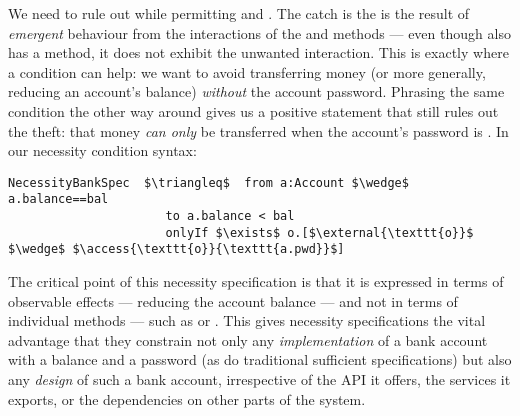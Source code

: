 We need to rule out  while permitting  and
. The catch is the   is the result
of  \emph{emergent} behaviour from the interactions of the 
and  methods --- even though  also has a
 method, it does not exhibit the unwanted interaction.
This is exactly where a  condition can help:
we want to avoid transferring money
(or more generally, reducing an account's balance)
\textit{without} the  account password.  Phrasing the same condition
the other way around gives us a positive statement that still
rules out the theft: that money \textit{can only} be
transferred when the account's password is .
In our necessity condition syntax:
%
%
%
%
%
%
\begin{lstlisting}[language = Chainmail, mathescape=true, frame=lines]
NecessityBankSpec  $\triangleq$  from a:Account $\wedge$ a.balance==bal
                      to a.balance < bal
                      onlyIf $\exists$ o.[$\external{\texttt{o}}$ $\wedge$ $\access{\texttt{o}}{\texttt{a.pwd}}$]
\end{lstlisting}
%
%
% 
The critical point of this necessity specification is that it is
expressed in terms of observable effects --- reducing the account
balance --- and not in terms of individual methods --- such as
 or .  This gives necessity specifications the
vital advantage that they constrain not only any
\textit{implementation} of a bank account with a balance and a
password (as do traditional sufficient specifications) but also any
\textit{design} of such a bank account, irrespective of the API it
offers, the services it exports, or the dependencies on other parts of
the system.
   
